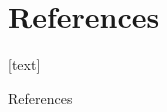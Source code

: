 \documentclass[handout]{beamer}
\begin{document}
\section{References}

[text]

\begin{frame}[allowframebreaks]{References}

\scriptsize

% 



\end{frame}


  
\end{document}
